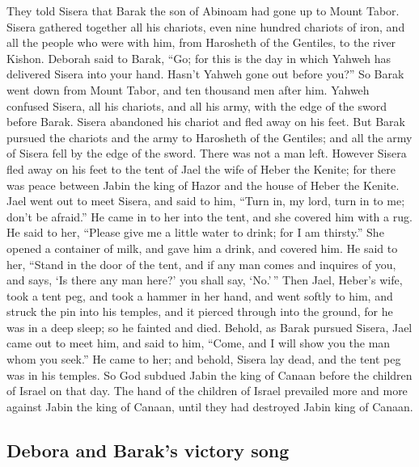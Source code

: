  They told Sisera that Barak the son of Abinoam had gone
up to Mount Tabor.  Sisera gathered together all his
chariots, even nine hundred chariots of iron, and all the people who
were with him, from Harosheth of the Gentiles, to the river Kishon.
 Deborah said to Barak, ``Go; for this is the day in
which Yahweh has delivered Sisera into your hand. Hasn't Yahweh gone out
before you?'' So Barak went down from Mount Tabor, and ten thousand men
after him.  Yahweh confused Sisera, all his chariots, and
all his army, with the edge of the sword before Barak. Sisera abandoned
his chariot and fled away on his feet.  But Barak pursued
the chariots and the army to Harosheth of the Gentiles; and all the army
of Sisera fell by the edge of the sword. There was not a man left.
 However Sisera fled away on his feet to the tent of Jael
the wife of Heber the Kenite; for there was peace between Jabin the king
of Hazor and the house of Heber the Kenite.  Jael went
out to meet Sisera, and said to him, ``Turn in, my lord, turn in to me;
don't be afraid.'' He came in to her into the tent, and she covered him
with a rug.  He said to her, ``Please give me a little
water to drink; for I am thirsty.'' She opened a container of milk, and
gave him a drink, and covered him.  He said to her,
``Stand in the door of the tent, and if any man comes and inquires of
you, and says, `Is there any man here?' you shall say, `No.'\,''
 Then Jael, Heber's wife, took a tent peg, and took a
hammer in her hand, and went softly to him, and struck the pin into his
temples, and it pierced through into the ground, for he was in a deep
sleep; so he fainted and died.  Behold, as Barak pursued
Sisera, Jael came out to meet him, and said to him, ``Come, and I will
show you the man whom you seek.'' He came to her; and behold, Sisera lay
dead, and the tent peg was in his temples.  So God
subdued Jabin the king of Canaan before the children of Israel on that
day.  The hand of the children of Israel prevailed more
and more against Jabin the king of Canaan, until they had destroyed
Jabin king of Canaan.

\hypertarget{debora-and-baraks-victory-song}{%
\subsection{Debora and Barak's victory
song}\label{debora-and-baraks-victory-song}}


